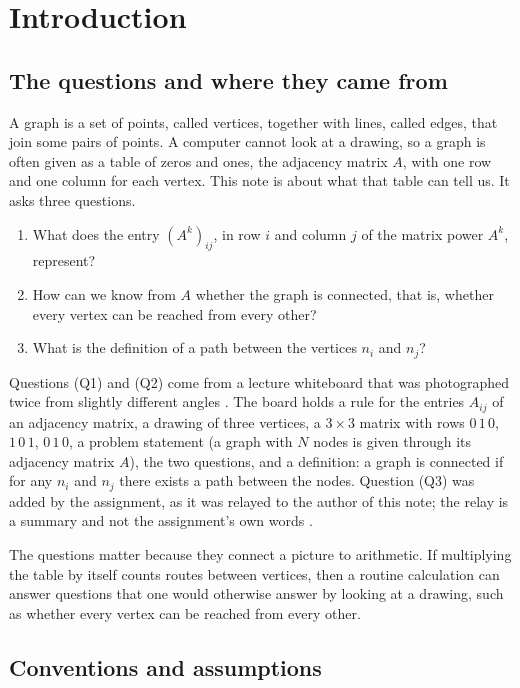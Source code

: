 \section{Introduction}\label{sec:intro}

\subsection{The questions and where they came from}

A graph is a set of points, called vertices, together with lines, called
edges, that join some pairs of points. A computer cannot look at a drawing,
so a graph is often given as a table of zeros and ones, the adjacency
matrix $A$, with one row and one column for each vertex. This note is
about what that table can tell us. It asks three questions.
\begin{enumerate}
\item[(Q1)] What does the entry $(A^k)_{ij}$, in row $i$ and column $j$ of
  the matrix power $A^k$, represent?
\item[(Q2)] How can we know from $A$ whether the graph is connected, that
  is, whether every vertex can be reached from every other?
\item[(Q3)] What is the definition of a path between the vertices $n_i$ and
  $n_j$?
\end{enumerate}
Questions (Q1) and (Q2) come from a lecture whiteboard that was
photographed twice from slightly different angles
\cite{whiteboard1,whiteboard2}. The board holds a rule for the entries
$A_{ij}$ of an adjacency matrix, a drawing of three vertices, a $3\times 3$
matrix with rows $0\,1\,0$, $1\,0\,1$, $0\,1\,0$, a problem statement (a
graph with $N$ nodes is given through its adjacency matrix $A$), the two
questions, and a definition: a graph is connected if for any $n_i$ and
$n_j$ there exists a path between the nodes. Question (Q3) was added by the
assignment, as it was relayed to the author of this note; the relay is a
summary and not the assignment's own words \cite{userstatements}.

The questions matter because they connect a picture to arithmetic. If
multiplying the table by itself counts routes between vertices, then a
routine calculation can answer questions that one would otherwise answer by
looking at a drawing, such as whether every vertex can be reached from
every other.

\subsection{Conventions and assumptions}\label{sec:conventions}

